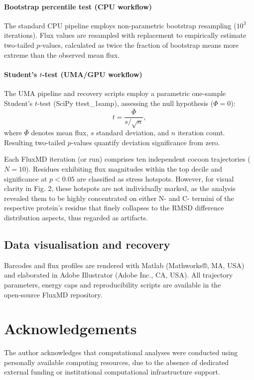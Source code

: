 \documentclass[pdflatex,sn-mathphys-num]{sn-jnl}
\begin{document}
\paragraph{Bootstrap percentile test (CPU workflow)}
The standard CPU pipeline employs non-parametric bootstrap resampling ($10^3$ iterations). Flux values are resampled with replacement to empirically estimate two-tailed $p$-values, calculated as twice the fraction of bootstrap means more extreme than the observed mean flux.

\paragraph{Student's $t$-test (UMA/GPU workflow)}
The UMA pipeline and recovery scripts employ a parametric one-sample Student's $t$-test (SciPy ttest\_1samp), assessing the null hypothesis ($\Phi=0$):
$$
t = \frac{\bar{\Phi}}{s/\sqrt{n}},
$$
where $\bar{\Phi}$ denotes mean flux, $s$ standard deviation, and $n$ iteration count. Resulting two-tailed $p$-values quantify deviation significance from zero.

Each FluxMD iteration (or run) comprises ten independent cocoon trajectories ($N=10$). Residues exhibiting flux magnitudes within the top decile and significance at $p<0.05$ are classified as stress hotspots. However, for visual clarity in Fig. 2, these hotspots are not individually marked, as the analysis revealed them to be highly concentrated on either N- and C- termini of the respective protein's residue that finely collapses to the RMSD difference distribution aspects, thus regarded as artifacts.

\subsection*{Data visualisation and recovery}
Barcodes and flux profiles are rendered with Matlab (Mathworks®, MA, USA) and elaborated in Adobe Illustrator (Adobe Inc., CA, USA).  All trajectory parameters, energy caps and reproducibility scripts are available in the open‑source FluxMD repository.

\section*{\protect\textbf{Acknowledgements}}
The author acknowledges that computational analyses were conducted using personally available computing resources, due to the absence of dedicated external funding or institutional computational infrastructure support.
\end{document}
